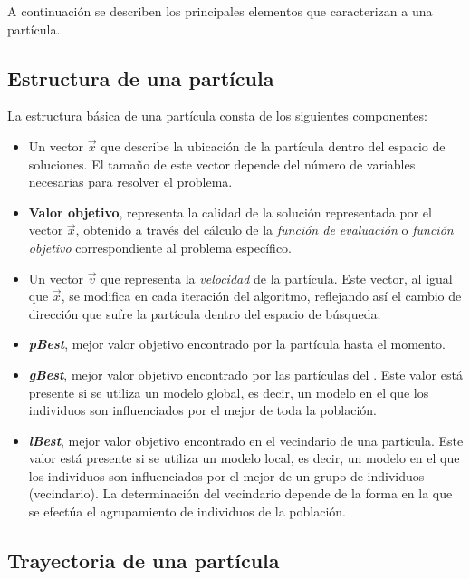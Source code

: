   A continuaci\'on se describen los principales elementos que caracterizan a una part\'icula.

    \subsection{Estructura de una part\'icula}

  La estructura b\'asica de una part\'icula consta de los siguientes componentes:

  \begin{itemize}
   \item Un vector $\vec{x}$ que describe la ubicaci\'on de la part\'icula dentro del espacio de soluciones. El tama\~no de este vector 
   depende del n\'umero de variables necesarias para resolver el problema.
   \item \textbf{Valor objetivo}, representa la calidad de la soluci\'on representada por el vector $\vec{x}$, obtenido a trav\'es del c\'alculo 
   de la \textit{funci\'on de evaluaci\'on} o \textit{funci\'on objetivo} correspondiente al problema espec\'ifico.
   \item Un vector $\vec{v}$ que representa la \textit{velocidad} de la part\'icula. Este vector, al igual que $\vec{x}$, se modifica en cada 
   iteraci\'on del algoritmo, reflejando as\'i el cambio de direcci\'on que sufre la part\'icula  dentro del espacio de b\'usqueda.
   \item \textbf{\textit{pBest}}, mejor valor objetivo encontrado por la part\'icula hasta el momento. 
   \item \textbf{\textit{gBest}}, mejor valor objetivo encontrado por las part\'iculas del \DIFdelbegin {}\DIFdelend \DIFaddbegin {}\DIFaddend . Este valor est\'a presente si se 
   utiliza un modelo global, es decir, un modelo en el que los individuos son influenciados por el mejor de toda la poblaci\'on.
   \item \textbf{\textit{lBest}}, mejor valor objetivo encontrado en el vecindario de una part\'icula. Este valor est\'a presente si se 
   utiliza un modelo local, es decir, un modelo en el que los individuos son influenciados por el mejor de un grupo de individuos 
   (vecindario). La determinaci\'on del vecindario depende de la forma en la que se efect\'ua el agrupamiento de individuos de la poblaci\'on.
  \end{itemize}

    \subsection{Trayectoria de una part\'icula}

